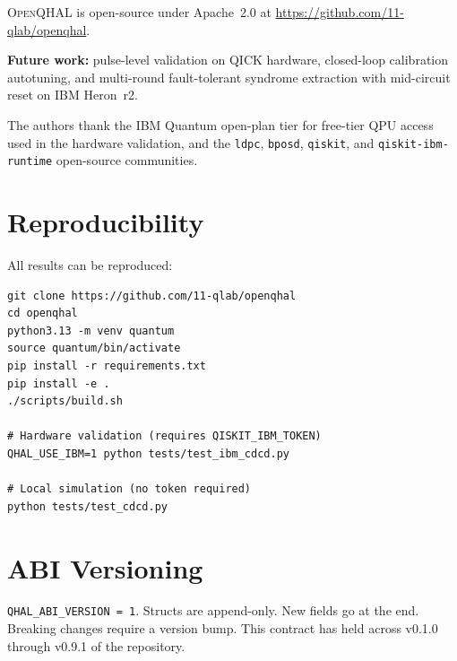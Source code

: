 \documentclass[aps,prApplied,twocolumn,superscriptaddress,floatfix]{revtex4-2}
\begin{document}
\textsc{OpenQHAL} is open-source under Apache~2.0 at
\url{https://github.com/11-qlab/openqhal}.

\textbf{Future work:} pulse-level validation on QICK hardware,
closed-loop calibration autotuning, and multi-round fault-tolerant
syndrome extraction with mid-circuit reset on IBM Heron~r2.

\begin{acknowledgments}
The authors thank the IBM Quantum open-plan tier for free-tier QPU
access used in the hardware validation, and the \texttt{ldpc},
\texttt{bposd}, \texttt{qiskit}, and \texttt{qiskit-ibm-runtime}
open-source communities.
\end{acknowledgments}

\appendix

\section{Reproducibility}
\label{app:repro}

All results can be reproduced:
\begin{lstlisting}
git clone https://github.com/11-qlab/openqhal
cd openqhal
python3.13 -m venv quantum
source quantum/bin/activate
pip install -r requirements.txt
pip install -e .
./scripts/build.sh

# Hardware validation (requires QISKIT_IBM_TOKEN)
QHAL_USE_IBM=1 python tests/test_ibm_cdcd.py

# Local simulation (no token required)
python tests/test_cdcd.py
\end{lstlisting}

\section{ABI Versioning}
\label{app:abi}

\texttt{QHAL\_ABI\_VERSION = 1}. Structs are append-only. New fields go
at the end. Breaking changes require a version bump. This contract has
held across v0.1.0 through v0.9.1 of the repository.


\end{document}

